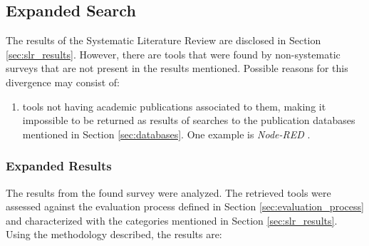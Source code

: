 \subsection{Expanded Search}\label{sec:slr_expanded_research}

The results of the Systematic Literature Review are disclosed in Section \ref{sec:slr_results}. However, there are tools that were found by non-systematic surveys \cite{survey_vpl_iot} that are not present in the results mentioned. Possible reasons for this divergence may consist of:
\begin{enumerate}
    \item tools not having academic publications associated to them, making it impossible to be returned as results of searches to the publication databases mentioned in Section \ref{sec:databases}. One example is \textit{Node-RED} \cite{node_red}.
\end{enumerate}

\subsubsection{Expanded Results}

The results from the found survey \cite{survey_vpl_iot} were analyzed. The retrieved tools were assessed against the evaluation process defined in Section \ref{sec:evaluation_process} and characterized with the categories mentioned in Section \ref{sec:slr_results}. Using the methodology described, the results are:

